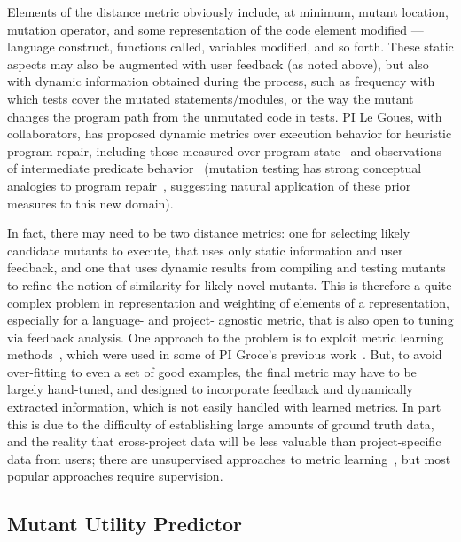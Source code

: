 Elements of the
distance metric obviously include, at minimum, mutant location, mutation operator, and
some representation of the code element modified --- language
construct, functions called, variables modified, and so forth.  These
static aspects may also be augmented with user feedback (as noted
above), but also with dynamic information obtained during the process,
such as frequency with which tests cover the mutated
statements/modules, or the way the mutant changes the
program path from the unmutated code in tests.  PI Le Goues, with collaborators,
has proposed dynamic metrics over execution behavior for heuristic program repair,
including those measured over program state~\cite{desouza-gecco18,oliveira-ese18} and
observations of intermediate predicate behavior~\cite{Ding2019} (mutation testing
has strong conceptual analogies to program repair~\cite{Weimer2013}, suggesting
natural application of these prior measures to this new domain).

 In fact, there may
need to be two distance metrics:  one for selecting likely candidate
mutants to execute, that uses only static information and user
feedback, and one that uses dynamic results from compiling and testing
mutants to refine the notion of similarity for likely-novel mutants.
This is therefore a quite complex problem in representation and weighting of elements of a
representation, especially for a language- and
project- agnostic metric, that is also open to tuning via feedback
analysis.  One approach to the problem is to exploit metric learning
methods~\cite{kulis2012metric}, which were used in some of PI Groce's
previous work~\cite{SoftMining}.  But, to avoid over-fitting
to even a set of good examples, the final metric may have to be largely
hand-tuned, and designed to incorporate feedback and dynamically
extracted information, which is not easily handled with learned metrics.  In part this is due to the difficulty of establishing
large amounts of ground truth data, and the reality that
cross-project data will be less valuable than project-specific data
from users; there are unsupervised
approaches to metric
learning~\cite{scholkopf1998nonlinear,tipping1999probabilistic}, but most
popular approaches require supervision.

\subsection{Mutant Utility Predictor}

